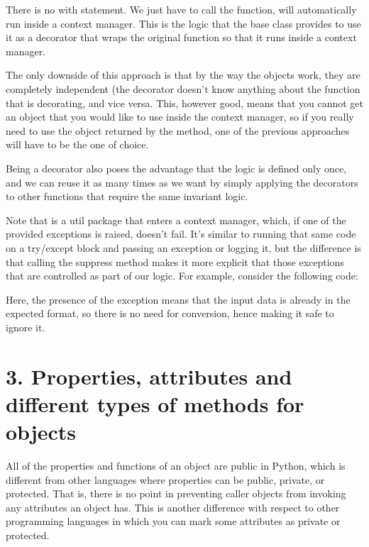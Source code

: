 \documentclass[a4paper,10pt,english]{sphinxmanual}
\begin{document}
There is no with statement. We just have to call the function,  will automatically run inside a
context manager. This is the logic that the base class provides to use it as a decorator that wraps the original
function so that it runs inside a context manager.

The only downside of this approach is that by the way the objects work, they are completely independent (the decorator
doesn’t know anything about the function that is decorating, and vice versa. This, however good, means that you cannot
get an object that you would like to use inside the context manager, so if you really need to use the object returned by
the  method, one of the previous approaches will have to be the one of choice.

Being a decorator also poses the advantage that the logic is defined only once, and we can reuse it as many times as we
want by simply applying the decorators to other functions that require the same invariant logic.

Note that  is a util package that enters a context manager, which, if one of the provided
exceptions is raised, doesn’t fail. It’s similar to running that same code on a try/except block and passing an
exception or logging it, but the difference is that calling the suppress method makes it more explicit that those
exceptions that are controlled as part of our logic. For example, consider the following code:

\begin{sphinxVerbatim}[commandchars=\\\{\}]
 

 
\end{sphinxVerbatim}

Here, the presence of the exception means that the input data is already in the expected format, so there is no need for
conversion, hence making it safe to ignore it.


\section{3. Properties, attributes and different types of methods for objects}
\label{\detokenize{chapters/2_pythonic_code/index:properties-attributes-and-different-types-of-methods-for-objects}}
All of the properties and functions of an object are public in Python, which is different from other languages where
properties can be public, private, or protected. That is, there is no point in preventing caller objects from invoking
any attributes an object has. This is another difference with respect to other programming languages in which you can
mark some attributes as private or protected.
\end{document}
